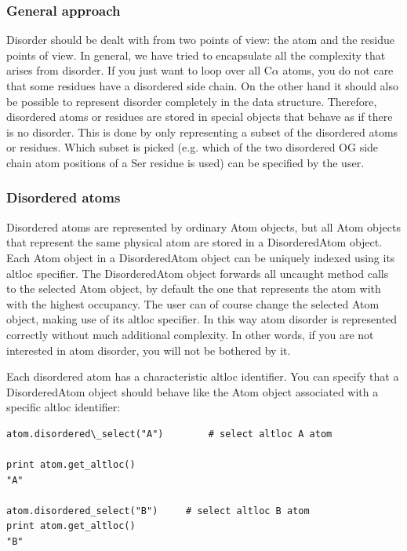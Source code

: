 \documentclass{report}
\begin{document}
\subsubsection{General approach\label{disorder problems}}

Disorder should be dealt with from two points of view: the atom and the residue
points of view. In general, we have tried to encapsulate all the complexity that
arises from disorder. If you just want to loop over all C\( \alpha  \) atoms,
you do not care that some residues have a disordered side chain. On the other
hand it should also be possible to represent disorder completely in the data
structure. Therefore, disordered atoms or residues are stored in special objects
that behave as if there is no disorder. This is done by only representing a
subset of the disordered atoms or residues. Which subset is picked (e.g. which
of the two disordered OG side chain atom positions of a Ser residue is used)
can be specified by the user.

\subsubsection{Disordered atoms\label{disordered atoms}}

Disordered atoms are represented by ordinary Atom objects, but all Atom objects
that represent the same physical atom are stored in a DisorderedAtom object.
Each Atom object in a DisorderedAtom object can be uniquely indexed using its
altloc specifier. The DisorderedAtom object forwards all uncaught method calls
to the selected Atom object, by default the one that represents the atom with
with the highest occupancy. The user can of course change the selected Atom
object, making use of its altloc specifier. In this way atom disorder is represented
correctly without much additional complexity. In other words, if you are not
interested in atom disorder, you will not be bothered by it.

Each disordered atom has a characteristic altloc identifier. You can specify
that a DisorderedAtom object should behave like the Atom object associated with
a specific altloc identifier:

\begin{verbatim}
atom.disordered\_select("A")		# select altloc A atom

print atom.get_altloc()
"A"

atom.disordered_select("B")	   	# select altloc B atom
print atom.get_altloc()
"B"
\end{verbatim}
\end{document}
